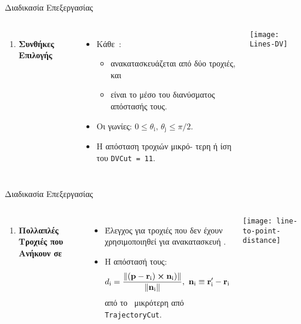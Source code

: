 \begin{frame}{Διαδικασία Επεξεργασίας}
	
	\begin{columns}
	\begin{enumerate}
		\conti
		\item \textbf{Συνθήκες Επιλογής \dvrecobf}
		\seti
	\end{enumerate}
	\vspace{4 mm}
	\begin{itemize}%
		\item Κάθε \dvreco\,: 
			\begin{itemize}
				\item ανακατασκευάζεται από δύο τροχιές, και
				\item είναι το μέσο του διανύσματος απόστασής τους.
			\end{itemize}
		\item Οι γωνίες: $0\leq\theta_\mathrm{i},\, \theta_\mathrm{j} \leq \pi/2$.
		\item Η απόσταση τροχιών μικρό- τερη ή ίση του \texttt{DVCut = 11}.
	\end{itemize}
	\texttt{[image: Lines-DV]}
	\end{columns}
\end{frame}

\begin{frame}{Διαδικασία Επεξεργασίας}
	
	\begin{columns}
	\column{0.7\textwidth}
	\begin{enumerate}
		\conti
		\item \textbf{Πολλαπλές Τροχιές που Ανήκουν σε }\dvrecobf
		\seti
	\end{enumerate}
	\begin{itemize}
		\item Έλεγχος για τροχιές που δεν έχουν χρησιμοποιηθεί για ανακατασκευή \dvreco.
		\item Η απόστασή τους:
			\begin{equation*}
				d_\mathrm{i} = \frac{\norm{(\vb{p}-\vb{r}_\mathrm{i})\cross\vb{n}_\mathrm{i})}}{\norm{\vb{n}_\mathrm{i}}},\ \vb{n}_\mathrm{i} \equiv \vb{r}'_\mathrm{i}-\vb{r}_\mathrm{i}
			\end{equation*}
		 από το \dvreco\ μικρότερη από \texttt{TrajectoryCut}.
	\end{itemize}
	\column{0.3\textwidth}	
	\texttt{[image: line-to-point-distance]}
	\end{columns}
\end{frame}

